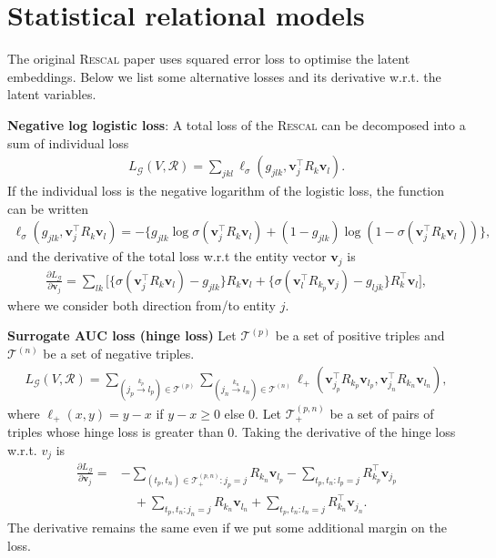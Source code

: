 \documentclass{article} %
\theoremstyle{definition}
\newcommand\mc{\mathcal} %
\newcommand\ts{\mathcal} %
\newcommand\mt{} %
\newcommand\vt{\mathbf} %
\newcommand\triple[3]{(#1 \stackrel{#2}\rightarrow #3)}
\begin{document}
\section*{Statistical relational models}
The original \textsc{Rescal} paper uses squared error loss to optimise the latent embeddings. Below we list some alternative losses and its derivative w.r.t. the latent variables.

\textbf{Negative log logistic loss}:
A total loss of the \textsc{Rescal} can be decomposed into a sum of individual loss
\begin{align}
L_\ts{G}(\mt{V}, \ts{R}) = \sum_{jkl} \ell_\sigma(g_{jlk}, \vt{v}_j^\top \mt{R}_{k} \vt{v}_l).
\end{align}
If the individual loss is the negative logarithm of the logistic loss, the function can be written
\begin{align}
\ell_\sigma(g_{jlk}, \vt{v}_j^\top \mt{R}_{k} \vt{v}_l) = - \bigg\{g_{jlk} \log \sigma(\vt{v}_j^\top \mt{R}_{k} \vt{v}_l) + (1- g_{jlk}) \log (1- \sigma(\vt{v}_j^\top \mt{R}_{k} \vt{v}_l))\bigg\},
\end{align}
and the derivative of the total loss w.r.t the entity vector $\vt{v}_j$ is
\begin{align}
\frac{\partial L_\ts{G}}{\partial \vt{v}_j} =  \sum_{lk}\bigg[\Big\{\sigma(\vt{v}_j^\top \mt{R}_{k} \vt{v}_l) - g_{jlk}\Big\} \mt{R}_{k} \vt{v}_l + \Big\{\sigma(\vt{v}_l^\top \mt{R}_{k_p} \vt{v}_j) - g_{ljk}\Big\} \mt{R}_{k}^\top \vt{v}_l \bigg],
\end{align}
where we consider both direction from/to entity $j$.

\textbf{Surrogate AUC loss (hinge loss)}
Let $\mc{T}^{(p)}$ be a set of positive triples and $\mc{T}^{(n)}$ be a set of negative triples.
\begin{align}
L_\ts{G}(\mt{V}, \ts{R}) = \sum_{\triple{j_p}{k_p}{l_p} \in \mc{T}^{(p)}}\sum_{\triple{j_n}{k_n}{l_n} \in \mc{T}^{(n)}} \ell_+(\vt{v}_{j_p}^\top \mt{R}_{k_p} \vt{v}_{l_p}, \vt{v}_{j_n}^\top \mt{R}_{k_n} \vt{v}_{l_n}),
\end{align}
where $\ell_+(x, y) = y - x$ if $y - x \geq 0$ else 0. Let $\mc{T}_+^{(p,n)}$ be a set of pairs of triples whose hinge loss is greater than 0. Taking the derivative of the hinge loss w.r.t. $v_j$ is
\begin{align}
\frac{\partial L_\ts{G}}{\partial \vt{v}_j} = &
- \sum_{(t_p, t_n) \in \mc{T}_+^{(p,n)} : j_p = j} \mt{R}_{k_n}\vt{v}_{l_p} - \sum_{t_p, t_n: l_p = j} \mt{R}_{k_p}^\top \vt{v}_{j_p} \\
& \quad + \sum_{t_p, t_n: j_n = j} \mt{R}_{k_n}\vt{v}_{l_n}  + \sum_{t_p, t_n: l_n = j} \mt{R}_{k_n}^\top \vt{v}_{j_n}.
\end{align}
The derivative remains the same even if we put some additional margin on the loss.
\end{document}

